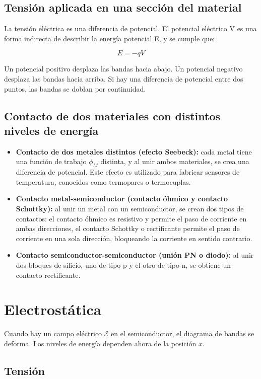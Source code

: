\subsection{Tensión aplicada en una sección del material}

La tensión eléctrica es una diferencia de potencial. El potencial eléctrico V es una forma indirecta de describir la energía potencial E, y se cumple que:

\[ E = -q V \]

Un potencial positivo desplaza las bandas hacia abajo. Un potencial negativo desplaza las bandas hacia arriba. Si hay una diferencia de potencial entre dos puntos, las bandas se doblan por continuidad.

\subsection{Contacto de dos materiales con distintos niveles de energía}

\begin{itemize}
    \item \textbf{Contacto de dos metales distintos (efecto Seebeck):} cada metal tiene una función de trabajo $\phi_M$ distinta, y al unir ambos materiales, se crea una diferencia de potencial. Este efecto es utilizado para fabricar sensores de temperatura, conocidos como termopares o termocuplas.
    \item \textbf{Contacto metal-semiconductor (contacto óhmico y contacto Schottky):} al unir un metal con un semiconductor, se crean dos tipos de contactos: el contacto óhmico es resistivo y permite el paso de corriente en ambas direcciones, el contacto Schottky o rectificante permite el paso de corriente en una sola dirección, bloqueando la corriente en sentido contrario.
    \item \textbf{Contacto semiconductor-semiconductor (unión PN o diodo):} al unir dos bloques de silicio, uno de tipo p y el otro de tipo n, se obtiene un contacto rectificante.
\end{itemize}


\newpage
\section{Electrostática}

Cuando hay un campo eléctrico $\mathcal{E}$ en el semiconductor, el diagrama de bandas se deforma. Los niveles de energía dependen ahora de la posición $x$.

\subsection{Tensión}


